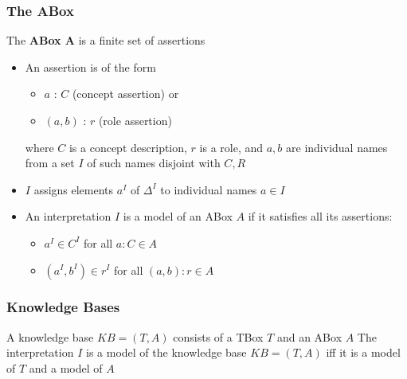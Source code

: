 \documentclass[conference, a4paper]{styles/acmsiggraph}
\begin{document}
        \subsubsection{The ABox}
            The \textbf{ABox A} is a finite set of assertions
            \begin{itemize}
                \item An assertion is of the form
                    \begin{itemize}
                        \item $a$ : $C$ (concept assertion) or
                        \item $(a,b)$ : $r$ (role assertion)
                    \end{itemize}
                    where $C$ is a concept description, $r$ is a role, and $a,b$ are individual names from a set $I$ of such names disjoint with $C,R$
                \item $I$ assigns elements $a^I$ of $\Delta^I$ to individual names $a \in I$
                \item An interpretation $I$ is a model of an ABox $A$ if it satisfies all its assertions:
                    \begin{itemize}
                        \item $a^I \in C^I$ for all $a : C \in A$
                        \item $(a^I,b^I) \in r^I$ for all $(a,b) : r \in A$
                    \end{itemize}
            \end{itemize}
        
        \subsubsection{Knowledge Bases}
            A knowledge base $KB = (T,A)$ consists of a TBox $T$ and an ABox $A$\newline
            The interpretation $I$ is a model of the knowledge base $KB = (T,A)$ iff it is a model of $T$ and a model of $A$
            
\end{document}
